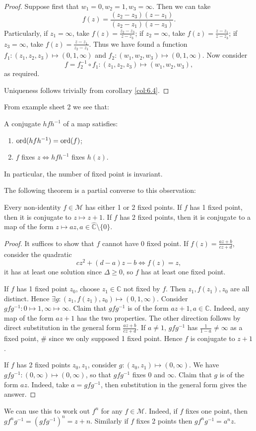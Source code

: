 \documentclass[a4paper]{article}
\begin{document}
\begin{proof}
  Suppose first that $w_1=0,w_2=1,w_3 = \infty $. Then we can take
  \[
    f(z)=\frac{(z_2-z_3)(z-z_1)}{(z_2-z_1)(z-z_3)}.
  \]
  Particularly, if $z_1=\infty$, take $ f(z)=\frac{z_2-z_3}{z-z_3} $;
  if $z_2=\infty$, take $ f(z)=\frac{z-z_1}{z-z_3} $; if
  $z_3=\infty$, take $ f(z)=\frac{z-z_1}{z_2-z_1} $. Thus we have
  found a function $ f_1: (z_1,z_2,z_3) \mapsto (0,1, \infty ) $ and
  $ f_2:(w_1,w_2,w_3)\mapsto (0,1,\infty ) $. Now consider
  \[
    f = f_2^{-1}\circ f_1: (z_1,z_2,z_3)\mapsto (w_1,w_2,w_3),
  \]
  as required.

  Uniqueness follows trivially from corollary \ref{col:6.4}.
\end{proof}
From example sheet 2 we see that:
\begin{proposition}\label{prop:egsheet2}
  A conjugate $ hfh^{-1} $ of a \mobius map satisfies:
  \begin{enumerate}
    \item $ \operatorname{ord}(hfh^{-1})=\operatorname{ord}(f) $;
    \item $f$ fixes $z \Leftrightarrow hfh^{-1}$ fixes $h(z)$.
  \end{enumerate}
  In particular, the number of fixed point is invariant.
\end{proposition}
The following theorem is a partial converse to this observation:
\begin{theorem}\label{thm:6.6}
  Every non-identity $f\in \mathcal{M}$ has either 1 or 2 fixed
  points. If $f$ has 1 fixed point, then it is conjugate to $ z
  \mapsto z+1 $. If $f$ has 2 fixed points, then it is conjugate to a
  map of the form $ z \mapsto az, a\in \hat{\mathbb{C}}\setminus \{0\} $.
\end{theorem}
\begin{proof}
  It suffices to show that $f$ cannot have 0 fixed point.
  If $ f(z)=\frac{az+b}{cz+d} $, consider the quadratic
  \[
    cz^2+(d-a)z-b \Longleftrightarrow f(z)=z,
  \]
  it has at least one solution since $ \Delta\ge 0 $, so $f$ has at
  least one fixed point.

  If $f$ has 1 fixed point $z_0$, choose $z_1\in \mathbb{C}$ not
  fixed by $f$. Then $ z_1,f(z_1),z_0 $ are all distinct. Hence $
  \exists g:(z_1,f(z_1),z_0)\mapsto (0,1,\infty) $. Consider $
  gfg^{-1}: 0 \mapsto 1, \infty \mapsto \infty $. Claim that
  $gfg^{-1}$ is of the form $ az+1,a\in \mathbb{C} $. Indeed, any map
  of the form $az+1$ has the two properties. The other direction
  follows by direct substitution in the general form
  $\frac{az+b}{cz+d}$. If $a\neq 1$, $gfg^{-1}$ has $
  \frac{1}{1-a}\neq \infty  $ as a fixed point, \# since we only
  supposed 1 fixed point. Hence $f$ is conjugate to $z+1$.

  If $f$ has 2 fixed points $z_0,z_1$, consider $ g:(z_0,z_1) \mapsto
  (0,\infty ) $. We have $ gfg^{-1}:(0,\infty ) \mapsto (0,\infty )
  $, so that $gfg^{-1}$ fixes $0$ and $\infty$. Claim that $g$ is of
  the form $az$. Indeed, take $ a=gfg^{-1} $, then substitution in
  the general form gives the answer.
\end{proof}
We can use this to work out $f^n$ for any $ f\in \mathcal{M} $.
Indeed, if $f$ fixes one point, then $gf^ng^{-1}=(gfg^{-1})^n=z+n$.
Similarly if $f$ fixes 2 points then $ gf^ng^{-1}=a^n z $.
\end{document}
